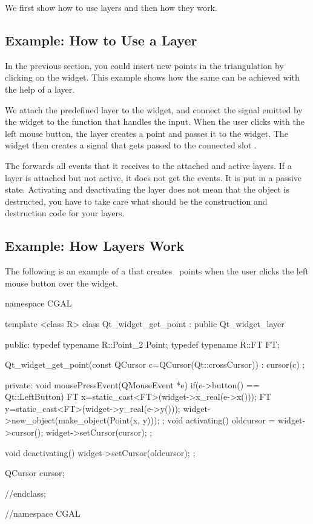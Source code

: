 We first show how to use layers and then how they work.

\subsection{Example: How to Use a Layer}

In the previous section, you could insert new points in the
triangulation by clicking on the widget. This example shows how
the same can be achieved with the help of a layer.

We attach the predefined layer  to the widget,
and connect the signal emitted by the widget to the function that
handles the input.  When the user clicks with the left mouse button,
the layer creates a point and passes it to the widget. The widget then
creates a signal that gets passed to the connected slot
.


The  forwards all events that it receives to the
attached and active layers. If a layer is attached but not active, it
does not get the events. It is put in a passive state. Activating and
deactivating the layer does not mean that the object is destructed,
you have to take care what should be the construction and destruction
code for your layers.

\subsection{Example: How Layers Work}

The following is an example of a  that creates \cgal\ points when
the user clicks the left mouse button over the widget. 
 
\begin{ccExampleCode}
namespace CGAL {
template <class R>
class Qt_widget_get_point : public Qt_widget_layer
{
public:
  typedef typename R::Point_2   Point;
  typedef typename R::FT        FT;
  
  Qt_widget_get_point(const QCursor c=QCursor(Qt::crossCursor)) :
    cursor(c) {};
  
private:
  void mousePressEvent(QMouseEvent *e)
  {
    if(e->button() == Qt::LeftButton)
    {
      FT x=static_cast<FT>(widget->x_real(e->x()));
      FT y=static_cast<FT>(widget->y_real(e->y()));
      widget->new_object(make_object(Point(x, y)));
    }
  };
  void activating()
  {
    oldcursor = widget->cursor();
    widget->setCursor(cursor);
  };
  
  void deactivating()
  {
    widget->setCursor(oldcursor);
  };

  QCursor cursor;
}//endclass;
}//namespace CGAL
\end{ccExampleCode}

